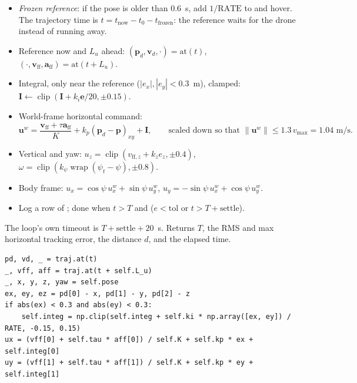 \begin{itemize}[nosep]
  \item \emph{Frozen reference}: if the pose is older than 0.6~s, add $1/\text{RATE}$ to  and hover.
        The trajectory time is $t = t_{\text{now}} - t_0 - t_{\text{frozen}}$: the reference waits for the
        drone instead of running away.
  \item Reference now and $L_u$ ahead: $(\mathbf p_d, \mathbf v_d, \cdot) = \text{at}(t)$,
        $(\cdot, \mathbf v_{\text{ff}}, \mathbf a_{\text{ff}}) = \text{at}(t + L_u)$.
  \item Integral, only near the reference ($|e_x|, |e_y| < 0.3$~m), clamped:
        $\mathbf I \leftarrow \operatorname{clip}(\mathbf I + k_i \mathbf e / 20, \pm 0.15)$.
  \item World-frame horizontal command:
        $$ \mathbf u^w = \frac{\mathbf v_{\text{ff}} + \tau \mathbf a_{\text{ff}}}{K} + k_p(\mathbf p_d - \mathbf p)_{xy}
        + \mathbf I, \qquad \text{scaled down so that } \lVert\mathbf u^w\rVert \le 1.3\,v_{\max} = 1.04\text{ m/s}. $$
  \item Vertical and yaw:
        $u_z = \operatorname{clip}(v_{\text{ff},z} + k_z e_z, \pm 0.4)$,
        $\omega = \operatorname{clip}(k_\psi \operatorname{wrap}(\psi_t - \psi), \pm 0.8)$.
  \item Body frame: $u_x = \cos\psi\,u^w_x + \sin\psi\,u^w_y$, $u_y = -\sin\psi\,u^w_x + \cos\psi\,u^w_y$.
  \item Log a row of ; done when $t > T$ and ($e < \text{tol}$ or $t > T + \text{settle}$).
\end{itemize}
The loop's own timeout is $T + \text{settle} + 20$~s. Returns $T$, the RMS and max horizontal tracking error,
the distance $d$, and the elapsed time.

\begin{lstlisting}
pd, vd, _ = traj.at(t)
_, vff, aff = traj.at(t + self.L_u)
_, x, y, z, yaw = self.pose
ex, ey, ez = pd[0] - x, pd[1] - y, pd[2] - z
if abs(ex) < 0.3 and abs(ey) < 0.3:
    self.integ = np.clip(self.integ + self.ki * np.array([ex, ey]) / RATE, -0.15, 0.15)
ux = (vff[0] + self.tau * aff[0]) / self.K + self.kp * ex + self.integ[0]
uy = (vff[1] + self.tau * aff[1]) / self.K + self.kp * ey + self.integ[1]
\end{lstlisting}

